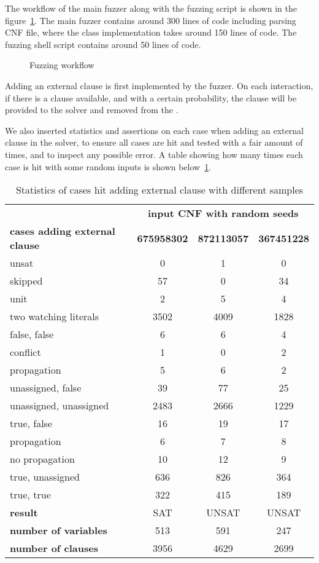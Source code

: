 The workflow of the main fuzzer along with the fuzzing script is shown in the figure~\ref{fig:fuzzer}. The main fuzzer contains around 300 lines of  code including parsing CNF file, where the  class implementation takes around 150 lines of code. The fuzzing shell script contains around 50 lines of code.

\begin{figure}[!htbp]
  \centering
  
  \caption{Fuzzing workflow}
  \label{fig:fuzzer}
\end{figure}

Adding an external clause is first implemented by the fuzzer. On each interaction, if there is a clause available, and with a certain probability, the clause will be provided to the solver and removed from the .

We also inserted statistics and assertions on each case when adding an external clause in the solver, to ensure all cases are hit and tested with a fair amount of times, and to inspect any possible error. A table showing how many times each case is hit with some random inputs is shown below~\ref{tab:stats}.

\begin{table}[!htbp]
  \centering
  \begin{tabular}{|l|c|c|c|}
    \hline
    & \multicolumn{3}{c|}{\textbf{input CNF with random seeds}} \\
    \cline{2-4}
    \textbf{cases adding external clause} & \textbf{675958302} & \textbf{872113057} & \textbf{367451228} \\
    \hline
    unsat & 0 & 1 & 0 \\
    skipped & 57 & 0 & 34 \\
    unit & 2 & 5 & 4 \\
    two watching literals & 3502 & 4009 & 1828 \\
    \quad false, false & 6 & 6 & 4 \\
    \quad\quad conflict & 1 & 0 & 2 \\
    \quad\quad propagation & 5 & 6 & 2 \\
    \quad unassigned, false & 39 & 77 & 25 \\
    \quad unassigned, unassigned & 2483 & 2666 & 1229 \\
    \quad true, false & 16 & 19 & 17 \\
    \quad\quad propagation & 6 & 7 & 8 \\
    \quad\quad no propagation & 10 & 12 & 9 \\
    \quad true, unassigned & 636 & 826 & 364 \\
    \quad true, true & 322 & 415 & 189 \\
    \hline
    \textbf{result} & SAT & UNSAT & UNSAT \\
    \textbf{number of variables} & 513 & 591 & 247 \\
    \textbf{number of clauses} & 3956 & 4629 & 2699 \\
    \hline
  \end{tabular}
  \caption{Statistics of cases hit adding external clause with different samples}
  \label{tab:stats}
\end{table}

